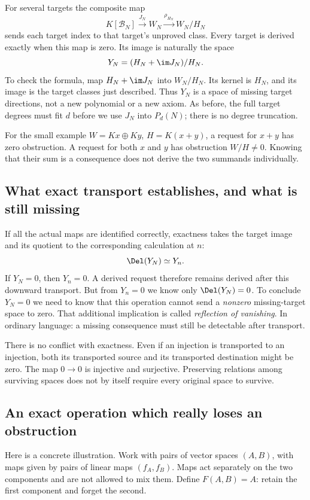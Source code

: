\documentclass[11pt,a4paper,oneside,openany]{book}
\theoremstyle{definition}\newtheorem{definition}[theorem]{Definition}
\theoremstyle{remark}\newtheorem{remark}[theorem]{Remark}
\numberwithin{equation}{chapter}
\begin{document}
For several targets the composite map
\[
 K[\mathcal B_N]\xrightarrow{J_N}W_N
                         \xrightarrow{\rho_{H_N}}W_N/H_N
\]
sends each target index to that target's unproved class.
Every target is derived exactly when this map is zero.
Its image is naturally the space
\[
                       Y_N=(H_N+\im J_N)/H_N.
\]
To check the formula, map $H_N+\im J_N$ into $W_N/H_N$.
Its kernel is $H_N$, and its image is the target classes just described.
Thus $Y_N$ is a space of missing target directions, not a new
polynomial or a new axiom.
As before, the full target degrees must fit $d$ before we use
$J_N$ into $P_d(N)$; there is no degree truncation.

For the small example $W=Kx\oplus Ky$, $H=K(x+y)$, a request for
$x+y$ has zero obstruction. A request for both $x$ and $y$ has
obstruction $W/H\ne0$. Knowing that their sum is a consequence
does not derive the two summands individually.

\subsection{What exact transport establishes, and what is still missing}
If all the actual maps are identified correctly, exactness takes the
target image and its quotient to the corresponding calculation at $n$:
\[
                             \Del(Y_N)\simeq Y_n.
\]
If $Y_N=0$, then $Y_n=0$. A derived request therefore remains derived
after this downward transport.
But from $Y_n=0$ we know only $\Del(Y_N)=0$.
To conclude $Y_N=0$ we need to know that this operation cannot
send a \emph{nonzero} missing-target space to zero.
That additional implication is called \emph{reflection of vanishing}.
In ordinary language: a missing consequence must still be detectable
after transport.

There is no conflict with exactness. Even if an injection is
transported to an injection, both its transported source and its
transported destination might be zero.
The map $0\to0$ is injective and surjective.
Preserving relations among surviving spaces does not by itself
require every original space to survive.

\subsection{An exact operation which really loses an obstruction}
Here is a concrete illustration. Work with pairs of vector spaces
$(A,B)$, with maps given by pairs of linear maps
$(f_A,f_B)$. Maps act separately on the two components and are not
allowed to mix them. Define $F(A,B)=A$: retain the first component
and forget the second.
\end{document}
